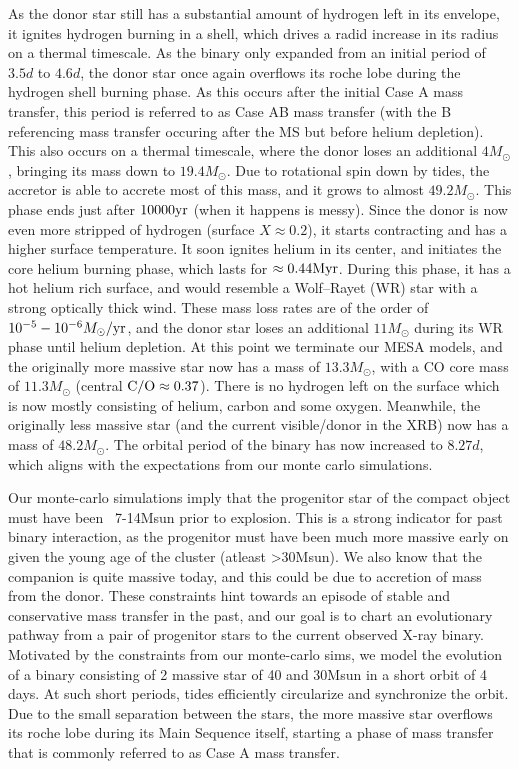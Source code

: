 \documentclass[linenumbers,trackchanges,twocolumn]{aastex701}
\begin{document}
As the donor star still has a substantial amount of hydrogen left in its envelope, it ignites hydrogen burning in a shell, which drives a radid increase in its radius on a thermal timescale. As the binary only expanded from an initial period of $3.5d$ to $4.6d$, the donor star once again overflows its roche lobe during the hydrogen shell burning phase. As this occurs after the initial Case A mass transfer, this period is referred to as Case AB mass transfer (with the B referencing mass transfer occuring after the MS but before helium depletion). This also occurs on a thermal timescale, where the donor loses an additional $4M_{\odot}$, bringing its mass down to $19.4M_{\odot}$. Due to rotational spin down by tides, the accretor is able to accrete most of this mass, and it grows to almost $49.2M_{\odot}$. This phase ends just after $10000 \rm yr$ (when it happens is messy).  Since the donor is now even more stripped of hydrogen (surface $X \approx 0.2$), it starts contracting and has a higher surface temperature. It soon ignites helium in its center, and initiates the core helium burning phase, which lasts for $\approx 0.44 \rm Myr$. During this phase, it has a hot helium rich surface, and would resemble a Wolf--Rayet (WR) star with a strong optically thick wind. These mass loss rates are of the order of $10^{-5} - 10^{-6} M_{\odot}/\rm yr$, and the donor star loses an additional $11M_{\odot}$ during its WR phase until helium depletion. At this point we terminate our MESA models, and the originally more massive star now has a mass of $13.3M_{\odot}$, with a CO core mass of $11.3M_{\odot}$ (central $\rm C/O \approx 0.37$). There is no hydrogen left on the surface which is now mostly consisting of helium, carbon and some oxygen. Meanwhile, the originally less massive star (and the current visible/donor in the XRB) now has a mass of $48.2M_{\odot}$. The orbital period of the binary has now increased to $8.27d$, which aligns with the expectations from our monte carlo simulations.

Our monte-carlo simulations imply that the progenitor star of the compact object must have been ~7-14Msun prior to explosion. This is a strong indicator for past binary interaction, as the progenitor must have been much more massive early on given the young age of the cluster (atleast >30Msun). We also know that the companion is quite massive today, and this could be due to accretion of mass from the donor. These constraints hint towards an episode of stable and conservative mass transfer in the past, and our goal is to chart an evolutionary pathway from a pair of progenitor stars to the current observed X-ray binary. Motivated by the constraints from our monte-carlo sims, we model the evolution of a binary consisting of 2 massive star of 40 and 30Msun in a short orbit of 4 days. At such short periods, tides efficiently circularize and synchronize the orbit. Due to the small separation between the stars, the more massive star overflows its roche lobe during its Main Sequence itself, starting a phase of mass transfer that is commonly referred to as Case A mass transfer.
\end{document}
